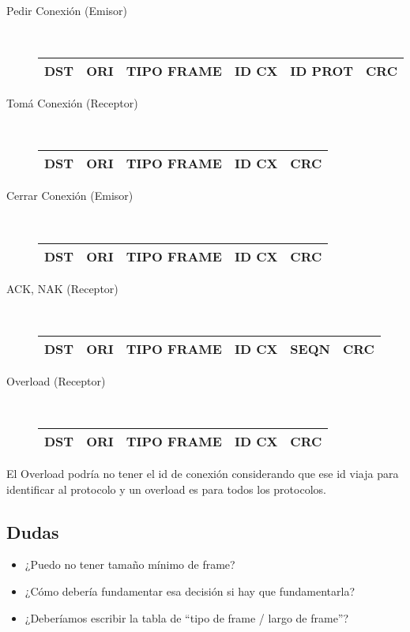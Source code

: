 \documentclass[a4paper,10pt]{article}
\begin{document}
\begin{description}
\item[Pedir Conexión (Emisor)]\ \\
\begin{tabular}{|c|c|c|c|c|c|}\hline
	DST & ORI & TIPO FRAME & ID CX & ID PROT & CRC\\\hline
\end{tabular}

\item[Tomá Conexión (Receptor)]\ \\
\begin{tabular}{|c|c|c|c|c|}\hline
	DST & ORI & TIPO FRAME & ID CX & CRC\\\hline
\end{tabular}

\item[Cerrar Conexión (Emisor)]\ \\
\begin{tabular}{|c|c|c|c|c|}\hline
	 DST & ORI & TIPO FRAME & ID CX & CRC \\\hline
\end{tabular}

\item[ACK, NAK (Receptor)]\ \\
\begin{tabular}{|c|c|c|c|c|c|}\hline
	DST & ORI & TIPO FRAME & ID CX & SEQN & CRC\\\hline
\end{tabular}

\item[Overload (Receptor)]\ \\
\begin{tabular}{|c|c|c|c|c|}\hline
	DST & ORI & TIPO FRAME & ID CX & CRC\\\hline
\end{tabular}

\end{description}

El Overload podría no tener el id de conexión considerando que ese id viaja para identificar al protocolo y un overload es para todos los protocolos.

\subsection*{Dudas}
\begin{itemize}
	\item ¿Puedo no tener tamaño mínimo de frame? 
	\item ¿Cómo debería fundamentar esa decisión si hay que fundamentarla?
	\item ¿Deberíamos escribir la tabla de ``tipo de frame / largo de frame''? 
\end{itemize}
\end{document}
